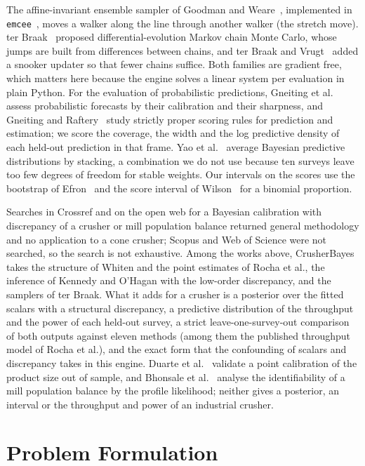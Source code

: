 \documentclass[journal]{IEEEtran}
\begin{document}
The affine-invariant ensemble sampler of Goodman and Weare~\cite{gw}, implemented in \texttt{emcee}~\cite{emcee}, moves a
walker along the line through another walker (the stretch move). ter Braak~\cite{tb06} proposed differential-evolution
Markov chain Monte Carlo, whose jumps are built from differences between chains, and ter Braak and Vrugt~\cite{tbv08}
added a snooker updater so that fewer chains suffice. Both families are gradient free, which matters here because the
engine solves a linear system per evaluation in plain Python. For the evaluation of probabilistic predictions, Gneiting et
al.~\cite{gneitingcal} assess probabilistic forecasts by their calibration and their sharpness, and Gneiting and
Raftery~\cite{gneiting} study strictly proper scoring rules for prediction and estimation; we score the coverage, the
width and the log predictive density of each held-out prediction in that frame. Yao et al.~\cite{yao} average Bayesian predictive distributions by stacking, a combination we do not use because ten surveys leave too few degrees of freedom for stable
weights. Our intervals on the scores use the bootstrap of Efron~\cite{efron} and the score interval of
Wilson~\cite{wilson} for a binomial proportion.

Searches in Crossref and on the open web for a Bayesian calibration with discrepancy of a crusher or mill population
balance returned general methodology and no application to a cone crusher; Scopus and Web
of Science were not searched, so the search is not exhaustive. Among the works above, CrusherBayes takes the structure of
Whiten and the point estimates of Rocha et al., the inference of Kennedy and O'Hagan with the low-order discrepancy, and
the samplers of ter Braak. What it adds for a crusher is a posterior over the fitted scalars with a structural
discrepancy, a predictive distribution of the throughput and the power of each held-out survey, a strict
leave-one-survey-out comparison of both outputs against eleven methods (among them the published throughput model of
Rocha et al.), and the exact form that the confounding of scalars and discrepancy takes in this engine. Duarte et
al.~\cite{duarte} validate a point calibration of the product size out of sample, and Bhonsale et al.~\cite{bhonsale}
analyse the identifiability of a mill population balance by the profile likelihood; neither gives a posterior, an interval
or the throughput and power of an industrial crusher.

\section{Problem Formulation}\label{sec:problem}
\end{document}
